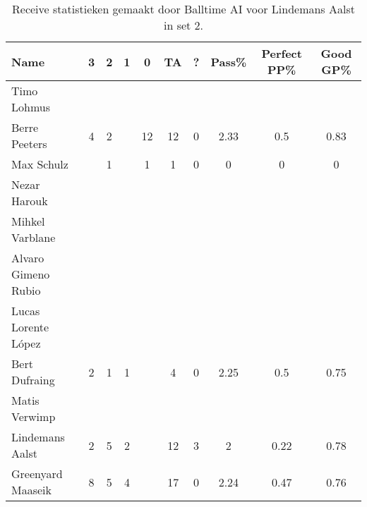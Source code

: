 \begin{table}[ht!]
  \centering
  \scriptsize
  \begin{tabular}{|l|c|c|c|c|c|c|c|c|c|} \hline
    \textbf{Name} & 3 & 2 & 1 & 0 & TA & ? & Pass\% & Perfect PP\% & Good GP\% \\ \hline
    Timo Lohmus &   &   &   &   &   &   &   &   &   \\
    Berre Peeters & 4 & 2 &   & 12 & 12 & 0 & 2.33 & 0.5 & 0.83 \\
    Max Schulz &   & 1 &   & 1 & 1 & 0 & 0 & 0 & 0 \\
    Nezar Harouk &   &   &   &   &   &   &   &   &   \\
    Mihkel Varblane &   &   &   &   &   &   &   &   &   \\
    Alvaro Gimeno Rubio &   &   &   &   &   &   &   &   &   \\
    Lucas Lorente López &   &   &   &   &   &   &   &   &   \\
    Bert Dufraing & 2 & 1 & 1 &   & 4 & 0 & 2.25 & 0.5 & 0.75 \\
    Matis Verwimp &   &   &   &   &   &   &   &   &   \\
    Lindemans Aalst & 2 & 5 & 2 &   & 12 & 3 & 2 & 0.22 & 0.78 \\
    Greenyard Maaseik & 8 & 5 & 4 &   & 17 & 0 & 2.24 & 0.47 & 0.76 \\ \hline
  \end{tabular}
  \caption[Receive statistieken gemaakt door Balltime AI voor Lindemans Aalst in set 2]{\label{tab:PL3ReceiveAalst2}Receive statistieken gemaakt door Balltime AI voor Lindemans Aalst in set 2.}
\end{table}

